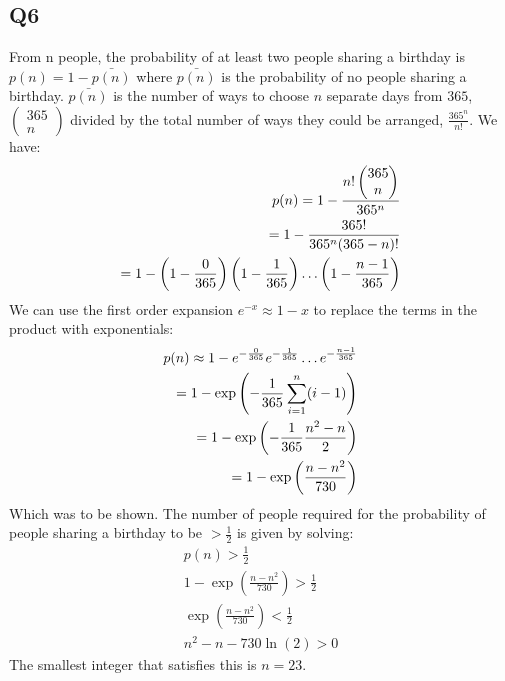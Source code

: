 \documentclass[../main.tex]{subfiles}
\begin{document}
\subsection{Q6}
From n people, the probability of at least two people sharing a birthday is $p(n)=1-\bar{p(n)}$ where $\bar{p(n)}$ is the probability of no people sharing a birthday. $\bar{p(n)}$ is the number of ways to choose $n$ separate days from $365$, $\left(\begin{matrix}365 \\ n\end{matrix}\right)$ divided by the total number of ways they could be arranged, $\frac{365^n}{n!}$. We have:
\begin{align*}
	p(n) = 1-\frac{n!\left(\begin{matrix}365\\n\end{matrix}\right)}{365^n}\\
	= 1-\frac{365!}{365^n(365-n)!}\\
	=1-\left(1-\frac{0}{365}\right)\left(1-\frac{1}{365}\right)\mathellipsis\left(1-\frac{n-1}{365}\right)
\end{align*}
We can use the first order expansion $e^{-x}\approx 1-x$ to replace the terms in the product with exponentials:
\begin{align}
	p(n)\approx 1-e^{-\frac{0}{365}}e^{-\frac{1}{365}}\mathellipsis e^{-\frac{n-1}{365}}\\
	=1-\exp\left(-\frac{1}{365}\sum_{i=1}^n(i-1)\right)\\
	=1-\exp\left(-\frac{1}{365}\frac{n^2-n}{2}\right)\\
	=1-\exp\left(\frac{n-n^2}{730}\right)
\end{align}
Which was to be shown.
The number of people required for the probability of people sharing a birthday to be $>\frac{1}{2}$ is given by solving:
\begin{align}
	p(n) > \frac{1}{2}\\
	1-\exp\left(\frac{n-n^2}{730}\right)>\frac{1}{2}\\
	\exp\left(\frac{n-n^2}{730}\right)<\frac{1}{2}\\
	n^2-n-730\ln(2)>0
\end{align}
The smallest integer that satisfies this is $n=23$.
\end{document}
